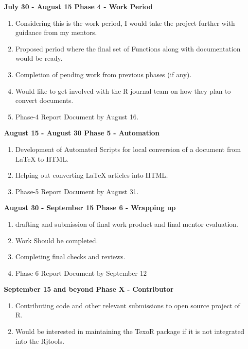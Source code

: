 \documentclass[12pt]{article}
\begin{document}
{\large\bfseries {\color{orange}July 30 - August 15} Phase 4 - Work Period}
\begin{enumerate}[label = {  \color{MediumBlue} \textbf{\arabic*. }},align=left]
\item Considering this is the work period, I would take the project further with guidance from my mentors.
\item Proposed period where the final set of Functions along with documentation would be ready.
\item Completion of pending work from previous phases (if any).
\item Would like to get involved with the R journal team on how they plan to convert documents.
\item Phase-4 Report Document by August 16.
\end{enumerate}
{\large\bfseries {\color{orange}August 15 - August 30} Phase 5 - Automation}
\begin{enumerate}[label = {  \color{MediumBlue} \textbf{\arabic*. }},align=left]
\item Development of Automated Scripts for local conversion of a document from LaTeX to HTML.
\item Helping out converting LaTeX articles into HTML.
\item Phase-5 Report Document by August 31.
\end{enumerate}
{\large\bfseries {\color{orange}August 30 - September 15} Phase 6 - Wrapping up}
\begin{enumerate}[label = {  \color{MediumBlue} \textbf{\arabic*. }},align=left]
\item drafting and submission of final work product and  final mentor evaluation.
\item Work Should be completed.
\item Completing final checks and reviews.
\item Phase-6 Report Document by September 12
\end{enumerate}
{\large\bfseries {\color{orange}September 15 and beyond } Phase X - Contributor}
\begin{enumerate}[label = {  \color{MediumBlue} \textbf{\arabic*. }},align=left]
\item Contributing code and other relevant submissions to open source project of R.
\item Would be interested in maintaining the TexoR package if it is not integrated into the Rjtools.
\end{enumerate}
\end{document}
